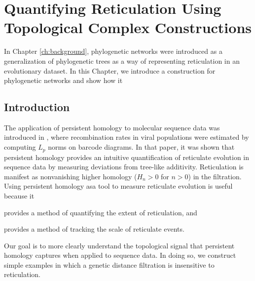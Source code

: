\chapter{Quantifying Reticulation Using Topological Complex Constructions}
\label{ch:complex_construction}

In Chapter \ref{ch:background}, phylogenetic networks were introduced as a generalization of phylogenetic trees as a way of representing reticulation in an evolutionary dataset.
In this Chapter, we introduce a construction for phylogenetic networks and show how it 

\section{Introduction}
\label{sec:introduction}

The application of persistent homology to molecular sequence data was introduced in \autocite{Chan:2013}, where recombination rates in viral populations were estimated by computing $L_p$ norms on barcode diagrams.
In that paper, it was shown that persistent homology provides an intuitive quantification of reticulate evolution in sequence data by measuring deviations from tree-like additivity.
Reticulation is manifest as nonvanishing higher homology ($H_{n}>0$ for $n>0$) in the filtration.
Using persistent homology asa tool to measure reticulate evolution is useful because it

\begin{inparaenum}[(1)]
\item provides a method of quantifying the extent of reticulation, and
\item provides a method of tracking the scale of reticulate events.
\end{inparaenum}

Our goal is to more clearly understand the topological signal that persistent homology captures when applied to sequence data.
In doing so, we construct simple examples in which a genetic distance filtration is insensitive to reticulation.


